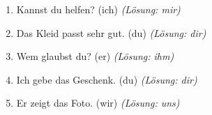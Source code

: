 \begin{enumerate}
    \item Kannst du \underline{\hspace{1cm}} helfen? (ich) \quad \textit{(Lösung: mir)}
    \item Das Kleid passt \underline{\hspace{1cm}} sehr gut. (du) \quad \textit{(Lösung: dir)}
    \item Wem glaubst du? (er) \quad \textit{(Lösung: ihm)}
    \item Ich gebe \underline{\hspace{1cm}} das Geschenk. (du) \quad \textit{(Lösung: dir)}
    \item Er zeigt \underline{\hspace{1cm}} das Foto. (wir) \quad \textit{(Lösung: uns)}
\end{enumerate}

\chapterend